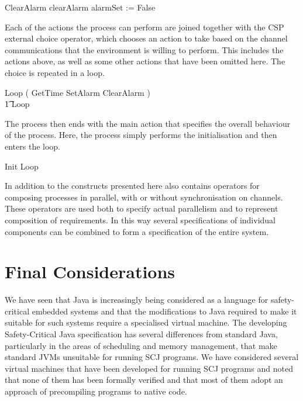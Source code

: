 \documentclass[a4paper,10pt]{report}
\begin{document}
%
\begin{circusaction}
  ClearAlarm \circdef clearAlarm \then alarmSet := False
\end{circusaction}
%
Each of the actions the process can perform are joined together with the CSP
external choice operator, which chooses an action to take based on the channel
communications that the environment is willing to perform. This includes the
actions above, as well as some other actions that have been omitted here. The
choice is repeated in a loop.
%
\begin{circusaction}
  Loop \circdef \left( GetTime \extchoice SetAlarm \extchoice ClearAlarm
    \extchoice \cdots \right) \\
  \t1 \circseq Loop
\end{circusaction}
%
The \Circus{} process then ends with the main action that specifies the overall
behaviour of the process. Here, the process simply performs the initialisation
and then enters the loop.
%
\begin{circusaction}
  \circspot Init \circseq Loop
\end{circusaction}
\begin{circus}
  \circend
\end{circus}

In addition to the constructs presented here \Circus{} also contains operators
for composing processes in parallel, with or without synchronisation on
channels.  These operators are used both to specify actual parallelism and to
represent composition of requirements.  In this way several \Circus{}
specifications of individual components can be combined to form a specification
of the entire system.

\section{Final Considerations}
\label{final-considerations-section}


We have seen that Java is increasingly being considered as a language for
safety-critical embedded systems and that the modifications to Java required to
make it suitable for such systems require a specialised virtual machine.  The
developing Safety-Critical Java specification has several differences from
standard Java, particularly in the areas of scheduling and memory management,
that make standard JVMs unsuitable for running SCJ programs.  We have considered
several virtual machines that have been developed for running SCJ programs and
noted that none of them has been formally verified and that most of them adopt
an approach of precompiling programs to native code.
\end{document}
